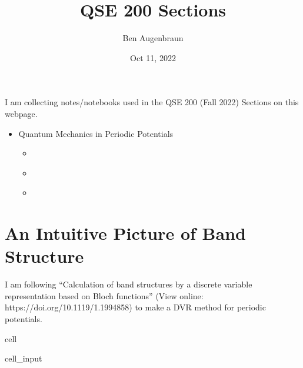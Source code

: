 \documentclass[letterpaper,10pt,english]{jupyterBook}
\title{QSE 200 Sections}
\date{Oct 11, 2022}
\author{Ben Augenbraun}
\begin{document}
\pagestyle{empty}
\sphinxmaketitle
\pagestyle{plain}
\sphinxtableofcontents
\pagestyle{normal}
\label{\detokenize{home::doc}}


\sphinxAtStartPar
I am collecting notes/notebooks used in the QSE 200 (Fall 2022) Sections on this webpage.
\begin{itemize}
\item {} 
\sphinxAtStartPar
Quantum Mechanics in Periodic Potentials

\begin{itemize}
\item {} 
\sphinxAtStartPar
{\hyperref[\detokenize{Section6::doc}]{}}

\item {} 
\sphinxAtStartPar
{\hyperref[\detokenize{translation-operator::doc}]{}}

\item {} 
\sphinxAtStartPar
{\hyperref[\detokenize{kronig-penney::doc}]{}}

\end{itemize}
\end{itemize}


\chapter{An Intuitive Picture of Band Structure}
\label{\detokenize{Section6:an-intuitive-picture-of-band-structure}}\label{\detokenize{Section6:test-label}}\label{\detokenize{Section6::doc}}
\sphinxAtStartPar
I am following “Calculation of band structures by a discrete variable representation based on Bloch functions” (View online: https://doi.org/10.1119/1.1994858) to make a DVR method for periodic potentials.

\begin{sphinxuseclass}{cell}\begin{sphinxVerbatimInput}

\begin{sphinxuseclass}{cell_input}
\begin{sphinxVerbatim}[commandchars=\\\{\}]
   
   
\end{sphinxVerbatim}

\end{sphinxuseclass}\end{sphinxVerbatimInput}

\end{sphinxuseclass}
\end{document}
